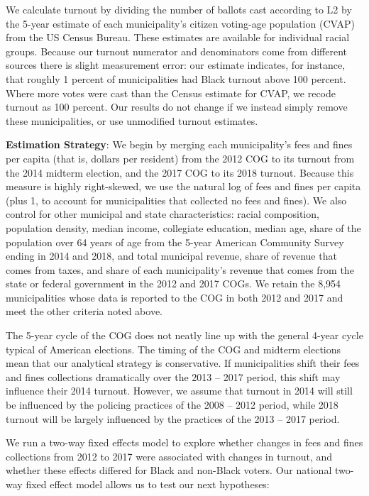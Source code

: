 \documentclass[
  12pt,
]{article}
\begin{document}
We calculate turnout by dividing the number of ballots cast according to L2 by the 5-year estimate of each municipality's citizen voting-age population (CVAP) from the US Census Bureau. These estimates are available for individual racial groups. Because our turnout numerator and denominators come from different sources there is slight measurement error: our estimate indicates, for instance, that roughly 1 percent of municipalities had Black turnout above 100 percent. Where more votes were cast than the Census estimate for CVAP, we recode turnout as 100 percent. Our results do not change if we instead simply remove these municipalities, or use unmodified turnout estimates.

\textbf{Estimation Strategy}: We begin by merging each municipality's fees and fines per capita (that is, dollars per resident) from the 2012 COG to its turnout from the 2014 midterm election, and the 2017 COG to its 2018 turnout. Because this measure is highly right-skewed, we use the natural log of fees and fines per capita (plus 1, to account for municipalities that collected no fees and fines). We also control for other municipal and state characteristics: racial composition, population density, median income, collegiate education, median age, share of the population over 64 years of age from the 5-year American Community Survey ending in 2014 and 2018, and total municipal revenue, share of revenue that comes from taxes, and share of each municipality's revenue that comes from the state or federal government in the 2012 and 2017 COGs. We retain the 8,954 municipalities whose data is reported to the COG in both 2012 and 2017 and meet the other criteria noted above.

The 5-year cycle of the COG does not neatly line up with the general 4-year cycle typical of American elections. The timing of the COG and midterm elections mean that our analytical strategy is conservative. If municipalities shift their fees and fines collections dramatically over the 2013 -- 2017 period, this shift may influence their 2014 turnout. However, we assume that turnout in 2014 will still be influenced by the policing practices of the 2008 -- 2012 period, while 2018 turnout will be largely influenced by the practices of the 2013 -- 2017 period.

We run a two-way fixed effects model to explore whether changes in fees and fines collections from 2012 to 2017 were associated with changes in turnout, and whether these effects differed for Black and non-Black voters. Our national two-way fixed effect model allows us to test our next hypotheses:
\end{document}
